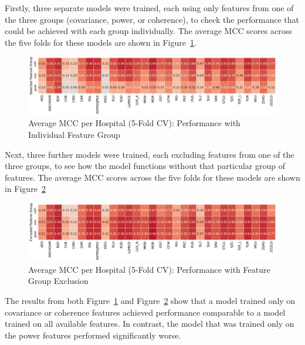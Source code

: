 \documentclass{bachelor2025eng}
\begin{document}
        Firstly, three separate models were trained, each using only features from one of the three groups (covariance, power, or coherence), to check the performance that could be achieved with each group individually. The average MCC scores across the five folds for these models are shown in Figure~\ref{fig:hospital_classification_mcc_selected_features}. 

        \begin{figure}[htbp]
        \centering
        \includegraphics[width=\textwidth]{results/selected_features_group_hospital_classification_avg_mcc_per_class.png}
        \caption{Average MCC per Hospital (5-Fold CV): Performance with Individual Feature Group}
        \label{fig:hospital_classification_mcc_selected_features}
        \end{figure}
        
        Next, three further models were trained, each excluding features from one of the three groups, to see how the model functions without that particular group of features. The average MCC scores across the five folds for these models are shown in Figure~\ref{fig:hospital_classification_mcc_exluded_features}

        \begin{figure}[htbp]
        \centering
        \includegraphics[width=\textwidth]{results/excluded_features_group_hospital_classification_avg_mcc_per_class.png}
        \caption{Average MCC per Hospital (5-Fold CV): Performance with Feature Group Exclusion}
        \label{fig:hospital_classification_mcc_exluded_features}
        \end{figure}

        The results from both Figure~\ref{fig:hospital_classification_mcc_selected_features} and Figure~\ref{fig:hospital_classification_mcc_exluded_features} show that a model trained only on covariance or coherence features achieved performance comparable to a model trained on all available features. In contrast, the model that was trained only on the power features performed significantly worse.
\end{document}
